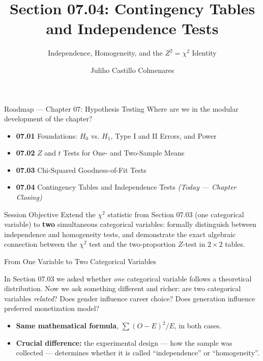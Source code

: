 \documentclass[10pt, aspectratio=169]{beamer}
\title[Contingency and Independence]{Section 07.04: Contingency Tables and Independence Tests}
\subtitle{Independence, Homogeneity, and the $Z^2=\chi^2$ Identity}
\author[J. Castillo Colmenares]{Juliho Castillo Colmenares}
\institute{Tecnológico de Monterrey}
\date{\vspace{-1.5cm}}
\begin{document}
\begin{frame}[plain]
  \titlepage
\end{frame}

\begin{frame}{Roadmap --- Chapter 07: Hypothesis Testing}
  \footnotesize
  Where are we in the modular development of the chapter? \pause
  \begin{itemize}\itemsep=0.08em
    \item \textbf{07.01} Foundations: $H_0$ vs. $H_1$, Type I and II Errors, and Power \pause
    \item \textbf{07.02} $Z$ and $t$ Tests for One- and Two-Sample Means \pause
    \item \textbf{07.03} Chi-Squared Goodness-of-Fit Tests \pause
    \item \textbf{07.04} Contingency Tables and Independence Tests \emph{(Today --- Chapter Closing)}
  \end{itemize}
  \vspace{-0.05cm}
  \begin{block}{Session Objective}
    Extend the $\chi^2$ statistic from Section 07.03 (one categorical variable) to \textbf{two} simultaneous categorical variables: formally distinguish between independence and homogeneity tests, and demonstrate the exact algebraic connection between the $\chi^2$ test and the two-proportion $Z$-test in $2\times2$ tables.
  \end{block}
\end{frame}

\begin{frame}{From One Variable to Two Categorical Variables}
  \footnotesize
  \begin{motivacion}
    In Section 07.03 we asked whether \emph{one} categorical variable follows a theoretical distribution. Now we ask something different and richer: are two categorical variables \emph{related}? Does gender influence career choice? Does generation influence preferred monetization model?
  \end{motivacion}

  \vspace{0.15cm}
  \pause
  \begin{itemize}\itemsep=0.1cm
    \item \textbf{Same mathematical formula}, $\sum(O-E)^2/E$, in both cases. \pause
    \item \textbf{Crucial difference:} the experimental design --- how the sample was collected --- determines whether it is called ``independence'' or ``homogeneity''.
  \end{itemize}
\end{frame}
\end{document}
